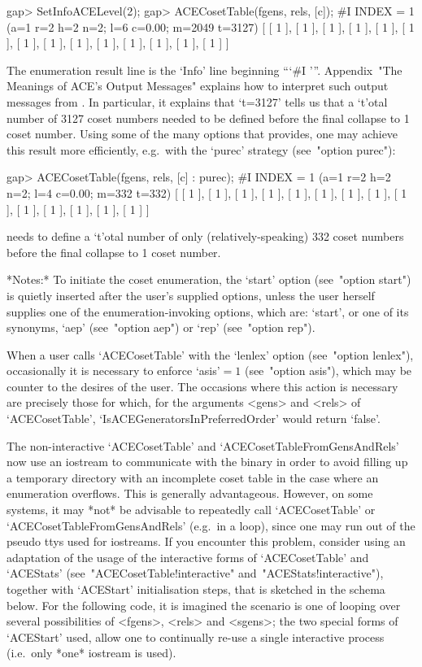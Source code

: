 \beginexample
gap> SetInfoACELevel(2);
gap> ACECosetTable(fgens, rels, [c]);
#I  INDEX = 1 (a=1 r=2 h=2 n=2; l=6 c=0.00; m=2049 t=3127)
[ [ 1 ], [ 1 ], [ 1 ], [ 1 ], [ 1 ], [ 1 ], [ 1 ], [ 1 ], [ 1 ], [ 1 ], 
  [ 1 ], [ 1 ], [ 1 ], [ 1 ] ]

\endexample

The enumeration result line is the `Info' line  beginning  ```\#I '''.
Appendix~"The Meanings of  ACE's  Output  Messages"  explains  how  to
interpret such output messages from {\ACE}. In particular, it explains
that `t=3127' tells us that a `t'otal number  of  3127  coset  numbers
needed to be defined before the final  collapse  to  1  coset  number.
Using some of the many options that {\ACE} provides, one  may  achieve
this  result  more  efficiently,  e.g.~with   the   `purec'   strategy
(see~"option purec"):

\beginexample
gap> ACECosetTable(fgens, rels, [c] : purec);
#I  INDEX = 1 (a=1 r=2 h=2 n=2; l=4 c=0.00; m=332 t=332)
[ [ 1 ], [ 1 ], [ 1 ], [ 1 ], [ 1 ], [ 1 ], [ 1 ], [ 1 ], [ 1 ], [ 1 ], 
  [ 1 ], [ 1 ], [ 1 ], [ 1 ] ]

\endexample

{\ACE} needs to define a `t'otal number of only  (relatively-speaking)
332 coset numbers before the final collapse to 1 coset number.

*Notes:* 
To initiate the coset enumeration,  the  `start'  option  (see~"option
start") is quietly inserted after the user's supplied options,  unless
the user herself supplies one  of  the  enumeration-invoking  options,
which are: `start', or one of its synonyms, `aep'  (see~"option  aep")
or `rep' (see~"option rep").

When  a  user  calls  `ACECosetTable'   with   the   `lenlex'   option
(see~"option  lenlex"),  occasionally  it  is  necessary  to   enforce
`asis'${}=1$ (see~"option asis"), which may be counter to the  desires
of the  user.  The  occasions  where  this  action  is  necessary  are
precisely those for which, for the  arguments  <gens>  and  <rels>  of
`ACECosetTable',   `IsACEGeneratorsInPreferredOrder'   would    return
`false'.

The non-interactive `ACECosetTable' and `ACECosetTableFromGensAndRels'
now use an iostream to communicate with the {\ACE} binary in order  to
avoid filling up a temporary directory with an incomplete coset  table
in  the  case  where  an  enumeration  overflows.  This  is  generally
advantageous. However, on some systems, it may *not* be  advisable  to
repeatedly  call  `ACECosetTable'  or   `ACECosetTableFromGensAndRels'
(e.g.~in a loop), since one may run out of the pseudo  ttys  used  for
iostreams. If you encounter this problem, consider using an adaptation
of  the  usage  of  the  interactive  forms  of  `ACECosetTable'   and
`ACEStats'                            (see~"ACECosetTable!interactive"
and~"ACEStats!interactive"), together with  `ACEStart'  initialisation
steps, that is sketched in the schema below. For the  following  code,
it  is  imagined  the  scenario  is  one  of  looping   over   several
possibilities of <fgens>, <rels> and <sgens>; the two special forms of
`ACEStart' used, allow one to continually re-use a single  interactive
{\ACE} process (i.e.~only *one* iostream is used).

